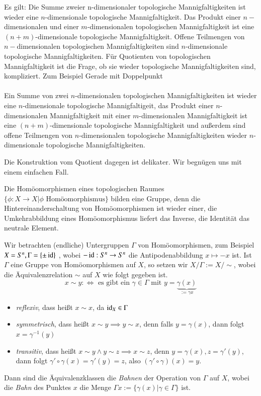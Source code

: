 \documentclass[a4paper,10pt]{scrartcl}
\begin{document}
Es gilt: Die Summe zweier n-dimensionaler topologische Mannigfaltigkeiten ist wieder eine $n$-dimensionale topologische Mannigfaltigkeit. Das Produkt einer $n-$dimensionalen und einer $m$-dimensionalen topologischen Mannigfaltigkeit ist eine $(n+m)$-dimensionale topologische Mannigfaltigkeit.  Offene Teilmengen von $n-$dimensionalen topologischen Mannigfaltigkeiten sind $n$-dimensionale topologische Mannigfaltigkeiten. Für Quotienten von topologischen Mannigfaltigkeit ist die Frage, ob sie wieder topologische Mannigfaltigkeiten sind, kompliziert.
Zum Beispiel Gerade mit Doppelpunkt\\
\fixme[fig33]\\
Ein Summe von zwei $n$-dimensionalen topologischen Mannigfaltigkeiten ist wieder eine $n$-dimensionale topologische Mannigfaltigeit, das Produkt einer $n$-dimensionalen Mannigfaltigkeit mit einer $m$-dimensionalen Mannigfaltigkeit ist eine $(n+ m)$-dimensionale topologische Mannigfaltigkeit und außerdem sind offene Teilmengen von $n$-dimensionalen topologische Mannigfaltigkeiten wieder $n$-dimensionale topologische Mannigfaltigkeiten.  

Die Konstruktion vom Quotient dagegen ist delikater. Wir begnügen uns mit einem einfachen Fall.

Die Homöomorphismen eines topologischen Raumes $\{\phi: X\to X|\phi \text{ Homöomorphismus}\}$ bilden eine Gruppe, denn die Hintereinanderschaltung von Homöomorphismen ist wieder einer, die Umkehrabbildung eines Homöomorphismus liefert das Inverse, die Identität das neutrale Element.

Wir betrachten (endliche) Untergruppen $\Gamma$ von Homöomorphismen, zum Beispiel $X=S^n, \Gamma=\{\pm \operatorname{id}\}$ , wobei $- \operatorname{id}: S^n\to S^n$ die Antipodenabbildung $x\mapsto -x$ ist. Ist $\Gamma$ eine Gruppe von Homöomorphismen auf $X$, so setzen wir $X/\Gamma:=X/\sim$, wobei die Äquivalenzrelation $\sim$ auf $X$ wie folgt gegeben ist.
\[
 x\sim y :\iff \text{ es gibt ein } \gamma\in \Gamma \text{ mit } y=\underbrace{\gamma(x)}_{:=\gamma x}
\]
\begin{itemize}
\item \emph{reflexiv}, dass heißt $x\sim x$, da $\operatorname{id}_X\in \Gamma$
\item \emph{symmetrisch}, dass heißt $x\sim y \implies y\sim x$, denn falls $y=\gamma(x)$, dann folgt $x=\gamma^{-1}(y)$
\item \emph{transitiv}, dass heißt $x\sim y \land y\sim z \implies x\sim z$, denn $y=\gamma(x), z=\gamma'(y)$, dann folgt $\gamma'\circ \gamma(x)=\gamma' (y)=z$, also $(\gamma'\circ \gamma)(x)=y$. 
\end{itemize}
Dann sind die Äquivalenzklassen die \emph{Bahnen} der Operation von $\Gamma$ auf $X$, wobei die \emph{Bahn} des Punktes $x$ die Menge $\Gamma x:=\{\gamma(x) | \gamma \in \Gamma\}$ ist.
\end{document}
